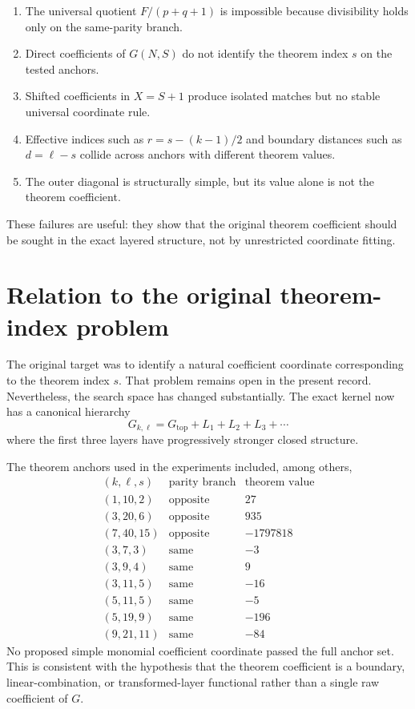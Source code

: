 \documentclass[11pt]{article}
\theoremstyle{remark}
\newcommand{\Lone}{L_1}
\newcommand{\Ltwo}{L_2}
\newcommand{\Lthree}{L_3}
\begin{document}
\begin{enumerate}[leftmargin=2em]
    \item The universal quotient \(F/(p+q+1)\) is impossible because divisibility
          holds only on the same-parity branch.
    \item Direct coefficients of \(G(N,S)\) do not identify the theorem index \(s\)
          on the tested anchors.
    \item Shifted coefficients in \(X=S+1\) produce isolated matches but no stable
          universal coordinate rule.
    \item Effective indices such as \(r=s-(k-1)/2\) and boundary distances such as
          \(d=\ell-s\) collide across anchors with different theorem values.
    \item The outer diagonal is structurally simple, but its value alone is not the
          theorem coefficient.
\end{enumerate}

These failures are useful: they show that the original theorem coefficient should be
sought in the exact layered structure, not by unrestricted coordinate fitting.

\section{Relation to the original theorem-index problem}

The original target was to identify a natural coefficient coordinate corresponding to
the theorem index \(s\).  That problem remains open in the present record.
Nevertheless, the search space has changed substantially.  The exact kernel now has a
canonical hierarchy
\[
\boxed{
G_{k,\ell}
=G_{\mathrm{top}}+\Lone+\Ltwo+\Lthree+\cdots
}
\]
where the first three layers have progressively stronger closed structure.

The theorem anchors used in the experiments included, among others,
\[
\begin{array}{c|c|c}
(k,\ell,s)&\text{parity branch}&\text{theorem value}\\
\hline
(1,10,2)&\text{opposite}&27\\
(3,20,6)&\text{opposite}&935\\
(7,40,15)&\text{opposite}&-1797818\\
(3,7,3)&\text{same}&-3\\
(3,9,4)&\text{same}&9\\
(3,11,5)&\text{same}&-16\\
(5,11,5)&\text{same}&-5\\
(5,19,9)&\text{same}&-196\\
(9,21,11)&\text{same}&-84
\end{array}
\]
No proposed simple monomial coefficient coordinate passed the full anchor set.
This is consistent with the hypothesis that the theorem coefficient is a boundary,
linear-combination, or transformed-layer functional rather than a single raw
coefficient of \(G\).
\end{document}
